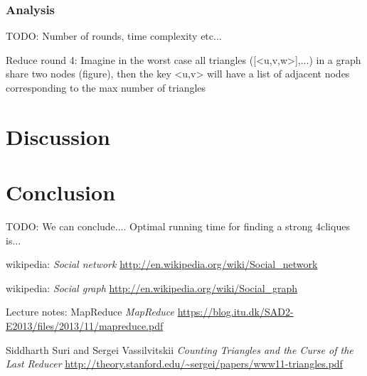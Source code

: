 \documentclass{article}
\begin{document}
\subsubsection{Analysis}
TODO: Number of rounds, time complexity etc...

Reduce round 4: Imagine in the worst case all triangles ([<u,v,w>],...) in a graph share two nodes (figure), then the key <u,v> will have a list of adjacent nodes corresponding to the max number of triangles


\section{Discussion}

\section{Conclusion}
TODO: We can conclude....
Optimal running time for finding a strong 4cliques is...

\begin{thebibliography}{1}

    wikipedia:
    \emph{Social network}
    \url{http://en.wikipedia.org/wiki/Social_network}

    wikipedia:
    \emph{Social graph}
    \url{http://en.wikipedia.org/wiki/Social_graph}

    Lecture notes: MapReduce
    \emph{MapReduce}
    \url{https://blog.itu.dk/SAD2-E2013/files/2013/11/mapreduce.pdf}

    Siddharth Suri and Sergei Vassilvitskii
    \emph{Counting Triangles and the Curse of the Last Reducer}
    \url{http://theory.stanford.edu/~sergei/papers/www11-triangles.pdf}
    
\end{thebibliography}
\end{document}
